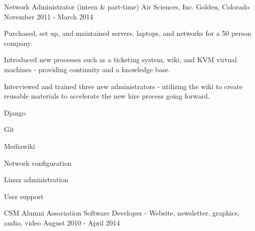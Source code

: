 \begin{cventries}
  \cventry%
    {Network Administrator (intern \& part-time)} %
    {Air Sciences, Inc.} %
    {Golden, Colorado} %
    {November 2011 \-- March 2014} %
    {%
      \begin{cvitems} %
        \item {Purchased, set up, and maintained servers, laptops, and networks for a 50 person company.}
        \item {Introduced new processes such as a ticketing system, wiki, and KVM virtual machines \-- providing continuity and a knowledge base.}
        \item {Interviewed and trained three new administrators \-- utilizing the wiki to create reusable materials to accelerate the new hire process going forward.}
      \end{cvitems}
    }
    \begin{cventryskills}
      \item Django
      \item Git
      \item Mediawiki
      \item Network configuration
      \item Linux administration
      \item User support
    \end{cventryskills}

  \cvline%
    {CSM Alumni Association} %
    {Software Developer \-- Website, newsletter, graphics, audio, video} %
    {August 2010 \-- April 2014} %
\end{cventries}

